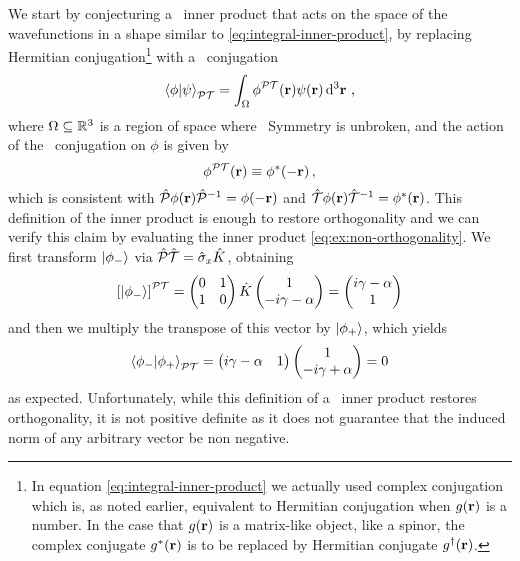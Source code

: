             We start by conjecturing \cite{bender2024} a \PT\ inner product that acts on the space of the wavefunctions in a shape similar to \eqref{eq:integral-inner-product}, by replacing Hermitian conjugation\footnote{In equation \eqref{eq:integral-inner-product} we actually used complex conjugation which is, as noted earlier, equivalent to Hermitian conjugation when $g\pqty{\vb{r}}$ is a number. In the case that $g\pqty{\vb{r}}$ is a matrix-like object, like a spinor, the complex conjugate $g^*\pqty{\vb{r}}$ is to be replaced by Hermitian conjugate $g^\dag\pqty{\vb{r}}$.} with a \PT\ conjugation
            \begin{equation}
                \label{eq:PT-inner-product-integral}
                \braket{\phi}{\psi}_{\PT} = \int\nolimits_{\Omega} \phi^{\PT}\pqty{\vb{r}} \psi\pqty{\vb{r}} \dd[3]{\vb{r}}
                \mycomma
            \end{equation}
            where $\Omega\subseteq\mathbb{R}^3$ is a region of space where \PT\ Symmetry is unbroken, and the action of the \PT\ conjugation on $\phi$ is given by
            \begin{equation*}
                \phi^{\PT}\pqty{\vb{r}} \equiv \phi^*\pqty{-\vb{r}}
                \mycomma
            \end{equation*}
            which is consistent with $\hP \phi\pqty{\vb{r}} \hP^{-1} = \phi\pqty{{-\vb{r}}}$ and $\hT \phi\pqty{\vb{r}} \hT^{-1} = \phi^*\pqty{{\vb{r}}}$. This definition of the inner product is enough to restore orthogonality and we can verify this claim by evaluating the inner product \eqref{eq:ex:non-orthogonality}. We first transform $\ket{\phi_-}$ via $\mathcal{\hat{P}}\mathcal{\hat{T}} = \hat{\sigma}_x \hat{K}$, obtaining
            \begin{equation*}
                \bqty{\ket{\phi_-}}^{\PT} = \pmqty{\admat[0]{1,1}} \hK \pmqty{1 \\ -i\gamma - \alpha} = \pmqty{i\gamma - \alpha \\ 1}
            \end{equation*}
            and then we multiply the transpose of this vector by $\ket{\phi_+}$, which yields
            \begin{equation*}
                \braket{\phi_-}{\phi_+}_{\PT} = \pmqty{i\gamma - \alpha & 1} \pmqty{1 \\ -i\gamma + \alpha} = 0
            \end{equation*}
            as expected. Unfortunately, while this definition of a \PT\ inner product restores orthogonality, it is not positive definite as it does not guarantee that the induced norm of any arbitrary vector be non negative.

